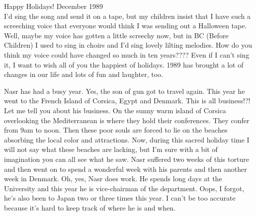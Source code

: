 
%

Happy Holidays! \hfill December 1989\\


I'd sing the song and send it on a tape, but my children insist that I have such a screeching voice that everyone would think I was sending out
a Halloween tape. Well, maybe my voice has gotten a little screechy now, but in BC (Before Children) I used to sing in choirs and I'd sing
lovely lilting melodies. How do you think my voice could have changed so much in ten years???? Even if I can't sing it, I want to wish all of
you the happiest of holidays. 1989 has brought a lot of changes in our life and lots of fun and laughter, too.

Nasr has had a busy year. Yes, the son of gun got to travel again. This year he went to the French Island of Corsica, Egypt and Denmark. This is
all business!?! Let me tell you about his business. On the sunny warm island of Corsica overlooking the Mediterranean is where they hold their
conferences. They confer from 9am to noon. Then these poor souls are forced to lie on the beaches absorbing the local color and attractions.
Now, during this sacred holiday time I will not say what these beaches are lacking, but I'm sure with a bit of imagination you can all see what
he saw. Nasr suffered two weeks of this torture and then went on to spend a wonderful week with his parents and then another week in Denmark.
Oh, yes, Nasr does work. He spends long days at the University and this year he is vice-chairman of the department. Oops, I forgot, he's also
been to Japan two or three times this year. I can't be too accurate because it's hard to keep track of where he is and when.

